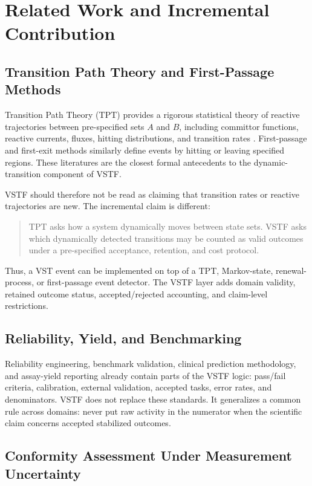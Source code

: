 \documentclass[11pt,a4paper]{article}
\newcommand{\1}{\mathbf{1}}
\begin{document}
\section{Related Work and Incremental Contribution}

\subsection{Transition Path Theory and First-Passage Methods}

Transition Path Theory (TPT) provides a rigorous statistical theory of reactive trajectories between pre-specified sets $A$ and $B$, including committor functions, reactive currents, fluxes, hitting distributions, and transition rates \cite{e2006,metzner2009}. First-passage and first-exit methods similarly define events by hitting or leaving specified regions. These literatures are the closest formal antecedents to the dynamic-transition component of VSTF.

VSTF should therefore not be read as claiming that transition rates or reactive trajectories are new. The incremental claim is different:

\begin{quote}
TPT asks how a system dynamically moves between state sets. VSTF asks which dynamically detected transitions may be counted as valid outcomes under a pre-specified acceptance, retention, and cost protocol.
\end{quote}

Thus, a VST event can be implemented on top of a TPT, Markov-state, renewal-process, or first-passage event detector. The VSTF layer adds domain validity, retained outcome status, accepted/rejected accounting, and claim-level restrictions.

\subsection{Reliability, Yield, and Benchmarking}

Reliability engineering, benchmark validation, clinical prediction methodology, and assay-yield reporting already contain parts of the VSTF logic: pass/fail criteria, calibration, external validation, accepted tasks, error rates, and denominators. VSTF does not replace these standards. It generalizes a common rule across domains: never put raw activity in the numerator when the scientific claim concerns accepted stabilized outcomes.

\subsection{Conformity Assessment Under Measurement Uncertainty}
\end{document}
